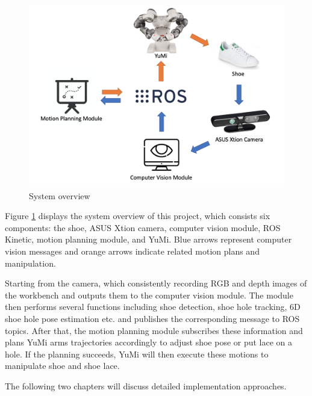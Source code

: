 \begin{figure}[H]
\centering
\includegraphics[width = \columnwidth]{AnalysisDesign/system.png}
\caption{System overview}
\label{c4}
\end{figure}

Figure \ref{c4} displays the system overview of this project, which consists six components: the shoe, ASUS Xtion camera, computer vision module, ROS Kinetic, motion planning module, and YuMi. Blue arrows represent computer vision messages and orange arrows indicate related motion plans and manipulation.

Starting from the camera, which consistently recording RGB and depth images of the workbench and outputs them to the computer vision module. The module then performs several functions including shoe detection, shoe hole tracking, 6D shoe hole pose estimation etc. and publishes the corresponding message to ROS topics. After that, the motion planning module subscribes these information and plans YuMi arms trajectories accordingly to adjust shoe pose or put lace on a hole. If the planning succeeds, YuMi will then execute these motions to manipulate shoe and shoe lace.

The following two chapters will discuss detailed implementation approaches.
